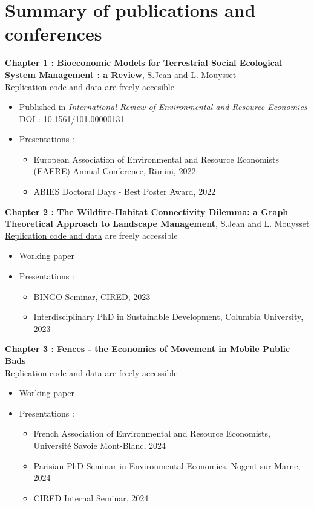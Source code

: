 \clearpage
\section*{Summary of publications and conferences}
\singlespacing
\textbf{Chapter 1 :  Bioeconomic Models for Terrestrial Social Ecological System Management : a Review}, S.Jean and L. Mouysset\\
\href{https://github.com/sim-jean/review-irere}{Replication code} and \href{https://zenodo.org/records/6656433}{data} are freely accesible
\begin{itemize}
\item Published in \textit{International Review of Environmental and Resource Economics}\\
 DOI : 10.1561/101.00000131
\item Presentations : 
\begin{itemize}
\item European Association of Environmental and Resource Economists (EAERE) Annual Conference, Rimini, 2022
\item ABIES Doctoral Days - Best Poster Award, 2022
\end{itemize}
\end{itemize}
%
\textbf{Chapter 2 : The Wildfire-Habitat Connectivity Dilemma: a Graph Theoretical Approach to Landscape Management}, S.Jean and L. Mouysset\\
\href{https://github.com/sim-jean/Landscape_connectivity_dilemma}{Replication code and data} are freely accessible
%
\begin{itemize}
\item Working paper
\item Presentations : 
\begin{itemize}
\item BINGO Seminar, CIRED, 2023
\item Interdisciplinary PhD in Sustainable Development, Columbia University, 2023
\end{itemize}
\end{itemize}
%
\textbf{Chapter 3 : Fences - the Economics of Movement in Mobile Public Bads}\\
\href{https://github.com/sim-jean/fences}{Replication code and data} are freely accessible
%
\begin{itemize}
\item Working paper
\item Presentations : 
\begin{itemize}
\item French Association of Environmental and Resource Economists, Université Savoie Mont-Blanc, 2024
\item Parisian PhD Seminar in Environmental Economics, Nogent sur Marne, 2024
\item CIRED Internal Seminar, 2024
\end{itemize}
\end{itemize}
